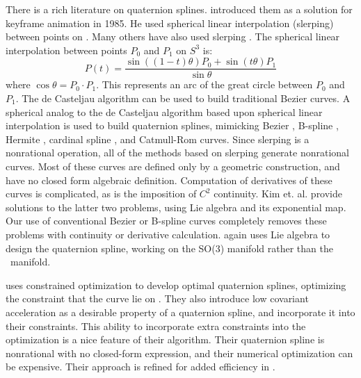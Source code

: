 There is a rich literature on quaternion splines.
\cite{shoemake85} introduced them as a solution 
for keyframe animation in 1985.
He used spherical linear interpolation (slerping) between points on .
Many others have also used slerping 
\cite{duff85,pletinckx89,schlag91,nielson92,nielson93,kim95,nam95}.
The spherical linear interpolation between points $P_0$ and $P_1$ on $S^3$ is:
\[ P(t) = \frac{\sin((1-t)\theta) P_0 + \sin(t \theta) P_1}{\sin \theta}
\]
where $\cos \theta = P_0 \cdot P_1$.
This represents an arc of the great circle between $P_0$ and $P_1$.
The de Casteljau algorithm can be used to build traditional Bezier curves.
A spherical analog to the de Casteljau algorithm based upon
spherical linear interpolation is used to build quaternion splines,
mimicking Bezier \cite{shoemake85,kim95}, B-spline 
\cite{duff85,nielson92,nielson93,kim95}, Hermite \cite{kim95,nam95},
cardinal spline \cite{pletinckx89}, and Catmull-Rom \cite{schlag91} curves.
Since slerping is a nonrational operation,
all of the methods based on slerping generate nonrational curves.
Most of these curves are defined only by a geometric construction, and have
no closed form algebraic definition.
Computation of derivatives of these curves is complicated,
as is the imposition of $C^2$ continuity.
Kim et. al. \cite{kim95} provide solutions to the latter two problems,
using Lie algebra and its exponential map.
Our use of conventional Bezier or B-spline curves completely removes 
these problems with continuity or derivative calculation.
\cite{park97} again uses Lie algebra to design the quaternion spline,
working on the SO(3) manifold rather than the \ manifold.

\cite{barr92} uses constrained optimization to develop optimal
quaternion splines, optimizing the constraint that the curve lie on .
They also introduce low covariant acceleration
as a desirable property of a quaternion spline,
and incorporate it into their constraints.
This ability to incorporate extra constraints into the optimization
is a nice feature of their algorithm.
Their quaternion spline is nonrational with no closed-form expression,
and their numerical optimization can be expensive.
Their approach is refined for added efficiency in \cite{rama97}.

